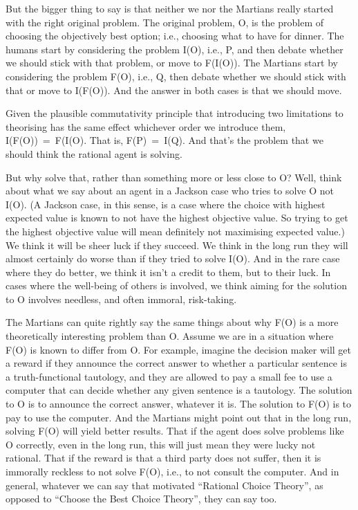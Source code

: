 \documentclass[
  12pt,
  letterpaper,
]{scrbook}
\begin{document}
But the bigger thing to say is that neither we nor the Martians really
started with the right original problem. The original problem, O, is the
problem of choosing the objectively best option; i.e., choosing what to
have for dinner. The humans start by considering the problem I(O), i.e.,
P, and then debate whether we should stick with that problem, or move to
F(I(O)). The Martians start by considering the problem F(O), i.e., Q,
then debate whether we should stick with that or move to I(F(O)). And
the answer in both cases is that we should move.

Given the plausible commutativity principle that introducing two
limitations to theorising has the same effect whichever order we
introduce them, I(F(O))~=~F(I(O). That is, F(P)~=~I(Q). And that's the
problem that we should think the rational agent is solving.

But why solve that, rather than something more or less close to O? Well,
think about what we say about an agent in a Jackson case who tries to
solve O not I(O). (A Jackson case, in this sense, is a case where the
choice with highest expected value is known to not have the highest
objective value. So trying to get the highest objective value will mean
definitely not maximising expected value.) We think it will be sheer
luck if they succeed. We think in the long run they will almost
certainly do worse than if they tried to solve I(O). And in the rare
case where they do better, we think it isn't a credit to them, but to
their luck. In cases where the well-being of others is involved, we
think aiming for the solution to O involves needless, and often immoral,
risk-taking.

The Martians can quite rightly say the same things about why F(O) is a
more theoretically interesting problem than O. Assume we are in a
situation where F(O) is known to differ from O. For example, imagine the
decision maker will get a reward if they announce the correct answer to
whether a particular sentence is a truth-functional tautology, and they
are allowed to pay a small fee to use a computer that can decide whether
any given sentence is a tautology. The solution to O is to announce the
correct answer, whatever it is. The solution to F(O) is to pay to use
the computer. And the Martians might point out that in the long run,
solving F(O) will yield better results. That if the agent does solve
problems like O correctly, even in the long run, this will just mean
they were lucky not rational. That if the reward is that a third party
does not suffer, then it is immorally reckless to not solve F(O), i.e.,
to not consult the computer. And in general, whatever we can say that
motivated ``Rational Choice Theory'', as opposed to ``Choose the Best
Choice Theory'', they can say too.
\end{document}
